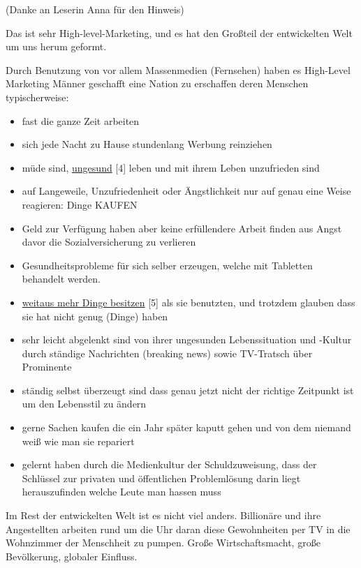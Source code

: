 \documentclass[10pt,a4paper,ngerman,twoside]{article} %
\begin{document}
(Danke an Leserin Anna für den Hinweis)

Das ist sehr High-level-Marketing, und es hat den Großteil der entwickelten Welt um uns herum geformt.

Durch Benutzung von vor allem Massenmedien (Fernsehen) haben es High-Level Marketing Männer geschafft eine Nation zu erschaffen deren Menschen typischerweise:

\begin{itemize}
\item fast die ganze Zeit arbeiten
\item sich jede Nacht zu Hause stundenlang Werbung reinziehen
\item müde sind, \href{http://www.raptitude.com/2010/10/being-healthy-is-not-normal/}{ungesund} [4] leben und mit ihrem Leben unzufrieden sind
\item auf Langeweile, Unzufriedenheit oder Ängstlichkeit nur auf genau eine Weise reagieren: Dinge KAUFEN
\item Geld zur Verfügung haben aber keine erfüllendere Arbeit finden aus Angst davor die Sozialversicherung zu verlieren
\item Gesundheitsprobleme für sich selber erzeugen, welche mit Tabletten behandelt werden.
\item \href{http://www.raptitude.com/2011/01/i-dont-want-stuff-any-more-only-things/}{weitaus mehr Dinge besitzen} [5] als sie benutzten, und trotzdem glauben dass sie hat nicht genug (Dinge) haben
\item sehr leicht abgelenkt sind von ihrer ungesunden Lebenssituation und -Kultur durch ständige Nachrichten (breaking news) sowie TV-Tratsch über Prominente
\item ständig selbst überzeugt sind dass genau jetzt nicht der richtige Zeitpunkt ist um den Lebensstil zu ändern
\item gerne Sachen kaufen die ein Jahr später kaputt gehen und von dem niemand weiß wie man sie repariert
\item gelernt haben durch die Medienkultur der Schuldzuweisung, dass der Schlüssel zur privaten und öffentlichen Problemlösung darin liegt herauszufinden welche Leute man hassen muss
\end{itemize}

Im Rest der entwickelten Welt ist es nicht viel anders. Billionäre und ihre Angestellten arbeiten rund um die Uhr daran diese Gewohnheiten per TV in die Wohnzimmer der Menschheit zu pumpen. Große Wirtschaftsmacht, große Bevölkerung, globaler Einfluss.
\end{document}
